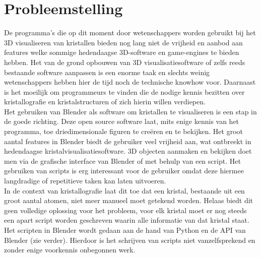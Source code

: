 \section{Probleemstelling}
De programma’s die op dit moment door wetenschappers worden gebruikt bij het 3D visualiseren van kristallen bieden nog lang niet de vrijheid en aanbod aan features welke sommige hedendaagse 3D-software en game-engines te bieden hebben. Het van de grond opbouwen van 3D visualisatiesoftware of zelfs reeds bestaande software aanpassen is een enorme taak en slechts weinig wetenschappers hebben hier de tijd noch de technische knowhow voor. Daarnaast is het moeilijk om programmeurs te vinden die de nodige kennis bezitten over kristallografie en kristalstructuren of zich hierin willen verdiepen.  
\\
Het gebruiken van Blender als software om kristallen te visualiseren is een stap in de goede richting. Deze open source software laat, mits enige kennis van het programma, toe driedimensionale figuren te creëren en te bekijken. Het groot aantal features in Blender biedt de gebruiker veel vrijheid aan, wat ontbreekt in hedendaagse kristalvisualisatiesoftware. 3D objecten aanmaken en bekijken doet men via de grafische interface van Blender of met behulp van een script. Het gebruiken van scripts is erg interessant voor de gebruiker omdat deze hiermee langdradige of repetitieve taken kan laten uitvoeren. 
\\
In de context van kristallografie laat dit toe dat een kristal, bestaande uit een groot aantal atomen, niet meer manueel moet getekend worden. Helaas biedt dit geen volledige oplossing voor het probleem, voor elk kristal moet er nog steeds een apart script worden geschreven waarin alle informatie van dat kristal staat. Het scripten in Blender wordt gedaan aan de hand van Python en de API van Blender (zie verder). Hierdoor is het schrijven van scripts niet vanzelfsprekend en zonder enige voorkennis onbegonnen werk.

